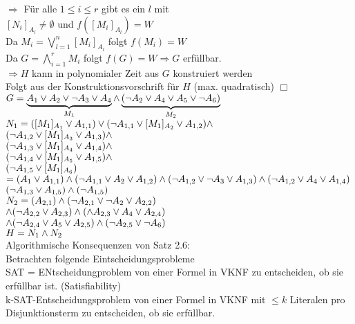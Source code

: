 $\Rightarrow$ Für alle $1 \leq i \leq r$ gibt es ein $l$ mit\\
$[N_i]_{A_l} \neq \emptyset$ und $f([M_i]_{A_l}) = W$\\
Da $M_i = \bigvee_{l=1}^n [M_i]_{A_l}$ folgt $f(M_i) = W$\\
Da $G = \bigwedge_{i=1}^r M_i$ folgt $f(G) = W \Rightarrow G $ erfüllbar.\\

$\Rightarrow H$ kann in polynomialer Zeit aus $G$ konstruiert werden\\
Folgt aus der Konstruktionsvorschrift für $H$ (max. quadratisch) $\Box$\\

\beispiel{}
$G = \underbrace{ A_1 \vee A_2 \vee \neg A_3 \vee A_4 }_{M_1} \wedge \underbrace{ (\neg A_2 \vee A_4 \vee A_5 \vee \neg A_6) }_{M_2}$\\

$N_1 = ([M_1]_{A_1} \vee A_{1,1}) \vee (\neg A_{1,1} \vee [M_1]_{A_2} \vee A_{1,2}) \wedge$\\
$( \neg A_{1,2} \vee [M_1]_{A_3} \vee A_{1,3}) \wedge$\\
$(\neg A_{1,3} \vee [M_1]_{A_4} \vee A_{1,4} ) \wedge$\\
$(\neg A_{1,4} \vee [M_1]_{A_5} \vee A_{1,5}) \wedge$\\
$(\neg A_{1,5} \vee [M_1]_{A_6})$\\
$= (A_1 \vee A_{1,1}) \wedge (\neg A_{1,1} \vee A_2 \vee A_{1,2}) \wedge ( \neg A_{1,2} \vee \neg A_3 \vee A_{1,3}) \wedge ( \neg A_{1,2} \vee A_4 \vee A_{1,4})$\\
$(\neg A_{1,3} \vee A_{1,5}) \wedge (\neg A_{1,5})$\\

$N_2 = (A_{2,1}) \wedge ( \neg A_{2,1} \vee \neg A_2 \vee A_{2,2})$\\
$\wedge (\neg A_{2,2} \vee A_{2,3}) \wedge (\wedge A_{2,3} \vee A_4 \vee A_{2,4})$\\
$\wedge ( \neg A_{2,4} \vee A_5 \vee A_{2,5}) \wedge (\neg A_{2,5} \vee \neg A_6)$\\
$H = N_1 \wedge N_2$\\

Algorithmische Konsequenzen von Satz 2.6:\\
Betrachten folgende Eintscheidungsprobleme\\
SAT = ENtscheidungproblem von einer Formel in VKNF zu entscheiden, ob sie erfüllbar ist. (Satisfiability)\\

k-SAT-Entscheidungsproblem von einer Formel in VKNF mit $\leq k$ Literalen pro Disjunktionsterm zu entscheiden, ob sie erfüllbar.\\

